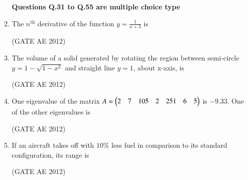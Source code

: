 \documentclass[journal,12pt,onecolumn]{IEEEtran}
\theoremstyle{remark}
\begin{document}
\begin{enumerate}
\textbf{Questions Q.31 to Q.55 are multiple choice type}



\item The $n^{\text{th}}$ derivative of the function $y = \frac{1}{x+3}$ is
\begin{enumerate}
\end{enumerate}
\hfill(GATE AE 2012)



\item The volume of a solid generated by rotating the region between semi-circle 
$y = 1 - \sqrt{1-x^2}$ and straight line $y = 1$, about x-axis, is
\begin{enumerate}
\end{enumerate}
\hfill(GATE AE 2012)



\item One eigenvalue of the matrix $A = \begin{pmatrix}2 & 7 & 10  5 & 2 & 25  1 & 6 & 5\end{pmatrix}$ is $-9.33$. One of the other eigenvalues is
\begin{enumerate}
\end{enumerate}
\hfill(GATE AE 2012)



\item If an aircraft takes off with $10\%$ less fuel in comparison to its standard configuration, its range is
\begin{enumerate}
\end{enumerate}
\hfill(GATE AE 2012)




\end{enumerate}
\end{document}
